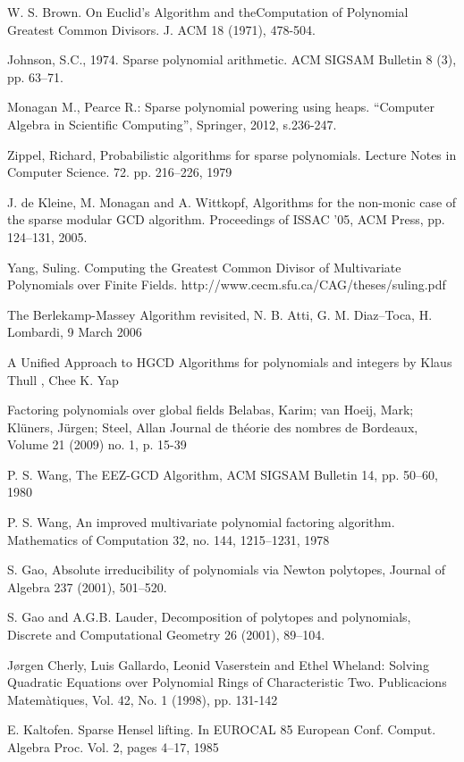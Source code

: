 \documentclass[11pt,reqno]{amsart}
\numberwithin{equation}{section}
\begin{document}
\begin{thebibliography}{99}
 W. S. Brown. On Euclid’s Algorithm and theComputation of Polynomial Greatest Common Divisors. J. ACM 18 (1971), 478-504.

 Johnson, S.C., 1974. Sparse polynomial arithmetic. ACM SIGSAM Bulletin 8 (3), pp. 63--71.

 Monagan M., Pearce R.: Sparse polynomial powering using heaps. “Computer Algebra in Scientific Computing”, Springer, 2012, s.236-247. 

 Zippel, Richard, Probabilistic algorithms for sparse polynomials. Lecture Notes in Computer Science. 72. pp. 216--226, 1979

  J. de Kleine, M. Monagan and A. Wittkopf, Algorithms for the non-monic case of the sparse modular GCD algorithm. Proceedings of ISSAC ’05, ACM Press, pp. 124--131, 2005.

 Yang, Suling. Computing the Greatest Common Divisor of Multivariate Polynomials over Finite Fields. http://www.cecm.sfu.ca/CAG/theses/suling.pdf
	
 The Berlekamp-Massey Algorithm revisited, N. B. Atti, G. M. Diaz–Toca, H. Lombardi, 9 March 2006
	
 A Unified Approach to HGCD Algorithms for polynomials and integers by Klaus Thull , Chee K. Yap
	
  Factoring polynomials over global fields Belabas, Karim; van Hoeij, Mark; Klüners, Jürgen; Steel, Allan Journal de théorie des nombres de Bordeaux, Volume 21 (2009) no. 1, p. 15-39

 P. S. Wang, The EEZ-GCD Algorithm, ACM SIGSAM Bulletin 14, pp. 50--60, 1980

 P. S. Wang, An improved multivariate polynomial factoring algorithm. Mathematics of Computation 32, no. 144, 1215--1231, 1978

 S. Gao, Absolute irreducibility of polynomials via Newton polytopes, Journal of Algebra
237 (2001), 501--520.

 S. Gao and A.G.B. Lauder, Decomposition of polytopes and polynomials, Discrete and Computational Geometry 26 (2001), 89--104.

 Jørgen Cherly, Luis Gallardo, Leonid Vaserstein and Ethel Wheland:  Solving Quadratic Equations over Polynomial Rings of Characteristic Two. Publicacions Matemàtiques, Vol. 42, No. 1 (1998), pp. 131-142

 E. Kaltofen.  Sparse Hensel lifting.  In EUROCAL 85 European Conf. Comput. Algebra Proc. Vol. 2, pages 4–17, 1985
\end{thebibliography}
\end{document}
